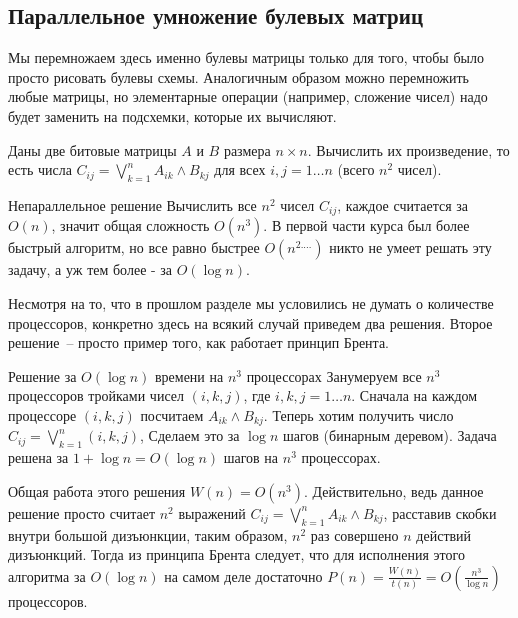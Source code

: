 \subsection{Параллельное умножение булевых матриц}
\begin{nb*}
    Мы перемножаем здесь именно булевы матрицы только для того, чтобы было просто рисовать булевы схемы.
    Аналогичным образом можно перемножить любые матрицы, но элементарные операции (например, сложение чисел)
    надо будет заменить на подсхемки, которые их вычисляют.
\end{nb*}

\begin{problem*}
	Даны две битовые матрицы $A$ и $B$ размера $n\times n$. Вычислить их произведение, то есть числа $C_{ij} = \bigvee_{k=1}^n A_{ik}\land B_{kj}$  для всех $i, j=1\ldots n$ (всего $n^2$  чисел).
\end{problem*}

\begin{algodescription}{Непараллельное решение}
    Вычислить все $n^2$ чисел $C_{ij}$, каждое считается за $O(n)$, значит общая сложность $O(n^3)$.
    В первой части курса был более быстрый алгоритм, но все равно быстрее $O(n^{2.\ldots})$
    никто не умеет решать эту задачу, а уж тем более - за $O(\log n)$.
\end{algodescription}

Несмотря на то, что в прошлом разделе мы условились не думать о количестве процессоров, конкретно здесь на всякий случай приведем два решения. Второе решение~-- просто пример того, как работает принцип Брента.

\begin{algodescription}{Решение за $O(\log n)$ времени на $n^3$ процессорах}
    Занумеруем все $n^3$ процессоров тройками чисел $(i, k, j)$, где $i,k,j=1\ldots n$. Сначала на каждом процессоре $(i, k, j)$ посчитаем $A_{ik}\land B_{kj}$. Теперь хотим получить число $C_{ij} = \bigvee_{k=1}^n (i, k, j)$, Сделаем это за $\log n$ шагов (бинарным деревом). Задача решена за $1+\log n = O(\log n) $ шагов на $n^3$ процессорах.
\end{algodescription}

Общая работа этого решения $W(n) = O(n^3)$. Действительно, ведь данное решение просто считает $n^2$ выражений $C_{ij} = \bigvee_{k=1}^n A_{ik}\land B_{kj}$, расставив скобки внутри большой дизъюнкции, таким образом, $n^2$ раз совершено $n$ действий дизъюнкций. Тогда из принципа Брента следует, что для исполнения этого алгоритма за $O(\log n)$ на самом деле достаточно $P(n) = \frac{W(n)}{t(n)} = O\left(\frac{n^3}{\log n}\right)$ процессоров.

